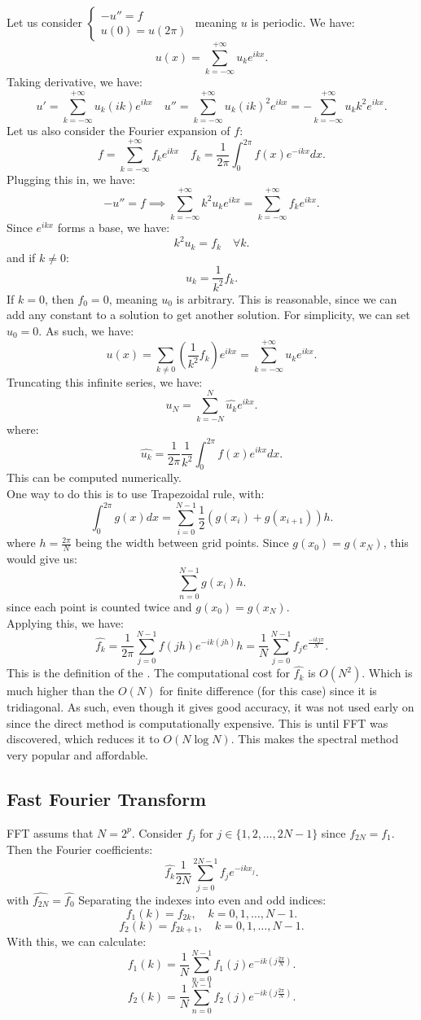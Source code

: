 \documentclass[../main/main.tex]{subfiles}
\begin{document}
Let us consider $\begin{cases}
    -u'' = f \\ 
    u(0) = u(2\pi)
\end{cases}$ meaning $u$ is periodic. We have:  \[
u(x) = \sum_{k=-\infty}^{+\infty} u_k e^{ikx}
.\] Taking derivative, we have: \[
u' = \sum_{k=-\infty}^{+\infty} u_k(ik) e^{ikx} \quad
u'' = \sum_{k=-\infty}^{+\infty} u_k(ik)^2 e^{ikx} =- \sum_{k=-\infty}^{+\infty} u_kk^2 e^{ikx} 
.\] Let us also consider the Fourier expansion of $f$:  \[
f = \sum_{k=-\infty}^{+\infty} f_k e^{ikx} \quad f_k = \frac{1}{2\pi} \int ^{2\pi}_0 f(x) e^{-ikx}dx
.\] Plugging this in, we have: \[
-u'' = f \implies \sum_{k=-\infty}^{+\infty} k^2u_k e^{ikx} = \sum_{k=-\infty}^{+\infty} f_k e^{ikx}
.\] Since $e^{ikx}$ forms a base, we have: \[
k^2 u_k = f_k \quad \forall  k
.\] and if $k\neq 0$:  \[
u_k = \frac{1}{k^2}f_k
.\] If $k = 0$, then  $f_0 = 0$, meaning  $u_0$ is arbitrary. This is reasonable,  since we can add any constant to a solution to get another solution. For simplicity, we can set  $u_0 = 0$. As such, we have:  \[
u(x) = \sum_{k\neq 0} \left( \frac{1}{k^2}f_k \right) e^{ikx} = \sum_{k=-\infty}^{+\infty} u_k e^{ikx}
.\] Truncating this infinite series, we have: \[
u_N = \sum_{k=-N}^{N} \hat{u_k} e^{ikx}
.\] where: \[
\hat{u_k} = \frac{1}{2\pi} \frac{1}{k^2}\int ^{2\pi}_0 f(x) e^{ikx}dx
.\] This can be computed numerically. \\

One way to do this is to use Trapezoidal rule, with: \[
    \int ^{2\pi}_0 g(x) dx = \sum_{i=0}^{N-1} \frac{1}{2}\left( g(x_i) + g(x_{i+1}) \right) h
.\] where $h = \frac{2\pi}{N}$ being the width between grid points. Since $g(x_0) = g(x_N)$, this would give us:  \[
\sum_{n=0}^{N-1} g(x_i) h
.\] since each point is counted twice and $g(x_0) = g(x_N)$. \\

Applying this, we have:  \[
\hat{f_k} = \frac{1}{2\pi} \sum_{j=0}^{N-1} f(jh) e^{-ik(jh)} h = \frac{1}{N} \sum_{j=0}^{N-1} f_j e^{\frac{-ikj \pi}{N}} 
.\] 
This is the definition of the . The computational cost for $\hat{f_k}$ is $O(N^2)$. Which is much higher than the $O(N)$ for finite difference (for this case) since it is tridiagonal. As such, even though it gives good accuracy, it was not used early on since the direct method is computationally expensive. This is until FFT was discovered, which reduces it to $O(N\log N)$. This makes the spectral method very popular and affordable.

\subsection{Fast Fourier Transform}
FFT assums that $N = 2^{p}$. Consider $f_j$ for  $j \in \{1,2,\ldots,2N-1\} $ since $f_{2N} = f_1$. Then the Fourier coefficients: \[
\hat{f_k} \frac{1}{2N} \sum_{j=0}^{2N-1} f_je^{-ikx_j}
.\] with $\hat{f_{2N}} = \hat{f_0}$ Separating the indexes into even and odd indices: \[
f_1(k) = f_{2k}, \quad k  = 0,1,\ldots,N-1
.\] \[
f_2(k) = f_{2k+1}, \quad k = 0,1,\ldots,N-1
.\] With this, we can calculate: \[
\hat{f_1}(k) = \frac{1}{N} \sum_{n=0}^{N-1} f_1(j) e^{-ik (j \frac{2\pi}{N})}
.\] \[ 
\hat{f_2}(k) = \frac{1}{N} \sum_{n=0}^{N-1} f_2(j) e^{-ik (j \frac{2\pi}{N})}
.\] 
\end{document}
